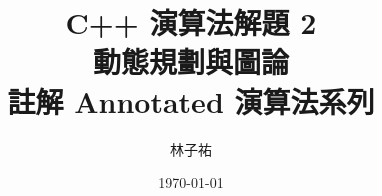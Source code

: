 \documentclass[12pt]{report}
\title{C++ 演算法解題 2\\[0.3em]{\LARGE 動態規劃與圖論}\\[1.2em]{\large 註解 Annotated 演算法系列}}
\author{林子祐}
\date{\today}
\begin{document}
\maketitle
\romantableofcontents















\end{document}

